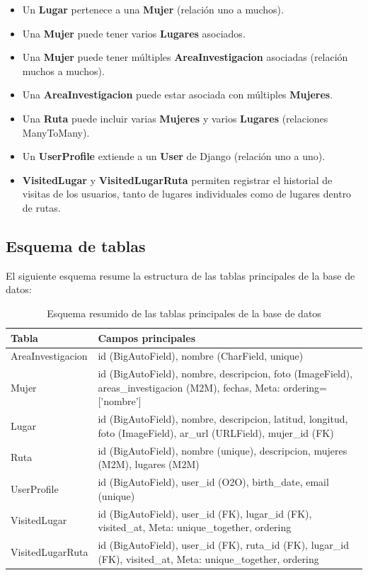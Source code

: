 \begin{itemize}
    \item Un \textbf{Lugar} pertenece a una \textbf{Mujer} (relación uno a muchos).
    \item Una \textbf{Mujer} puede tener varios \textbf{Lugares} asociados.
    \item Una \textbf{Mujer} puede tener múltiples \textbf{AreaInvestigacion} asociadas (relación muchos a muchos).
    \item Una \textbf{AreaInvestigacion} puede estar asociada con múltiples \textbf{Mujeres}.
    \item Una \textbf{Ruta} puede incluir varias \textbf{Mujeres} y varios \textbf{Lugares} (relaciones ManyToMany).
    \item Un \textbf{UserProfile} extiende a un \textbf{User} de Django (relación uno a uno).
    \item \textbf{VisitedLugar} y \textbf{VisitedLugarRuta} permiten registrar el historial de visitas de los usuarios, tanto de lugares individuales como de lugares dentro de rutas.
\end{itemize}

\subsection{Esquema de tablas}

El siguiente esquema resume la estructura de las tablas principales de la base de datos:

\begin{table}[H]
\centering
\begin{tabularx}{\textwidth}{l X}
\textbf{Tabla} & \textbf{Campos principales} \\
\hline
AreaInvestigacion & id (BigAutoField), nombre (CharField, unique) \\
Mujer & id (BigAutoField), nombre, descripcion, foto (ImageField), areas\_investigacion (M2M), fechas, Meta: ordering=['nombre'] \\
Lugar & id (BigAutoField), nombre, descripcion, latitud, longitud, foto (ImageField), ar\_url (URLField), mujer\_id (FK) \\
Ruta & id (BigAutoField), nombre (unique), descripcion, mujeres (M2M), lugares (M2M) \\
UserProfile & id (BigAutoField), user\_id (O2O), birth\_date, email (unique) \\
VisitedLugar & id (BigAutoField), user\_id (FK), lugar\_id (FK), visited\_at, Meta: unique\_together, ordering \\
VisitedLugarRuta & id (BigAutoField), user\_id (FK), ruta\_id (FK), lugar\_id (FK), visited\_at, Meta: unique\_together, ordering \\
\end{tabularx}
\caption{Esquema resumido de las tablas principales de la base de datos}
\end{table}

